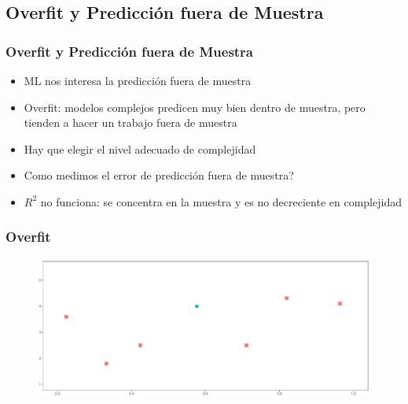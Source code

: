 \documentclass[
  shownotes,
  xcolor={svgnames},
  hyperref={colorlinks,citecolor=DarkBlue,linkcolor=DarkRed,urlcolor=DarkBlue}
  , aspectratio=169]{beamer}
\begin{document}
\subsection{Overfit y Predicción fuera de Muestra}
\begin{frame}[fragile]
\frametitle{Overfit y Predicción fuera de Muestra}


\begin{itemize}
  \item ML nos interesa la predicción fuera de muestra
  \medskip
  \item Overfit: modelos complejos predicen muy bien dentro de muestra, pero tienden a hacer un trabajo fuera de muestra 
  \medskip
  \item Hay que elegir el nivel adecuado de complejidad 
  \medskip
  \item Como medimos el error de predicción fuera de muestra?
  \medskip
  \item $R^2$ no funciona: se concentra en la muestra y es no decreciente en complejidad
\end{itemize}

\end{frame}

\begin{frame}
\frametitle{Overfit}


        \begin{figure}[H] \centering
            \captionsetup{justification=centering}
              \includegraphics[scale=0.4]{figures/fig_1g.pdf}
 \end{figure}

\end{frame}
\end{document}
